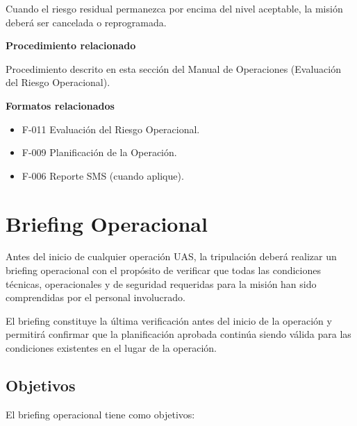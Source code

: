 Cuando el riesgo residual permanezca por encima del nivel aceptable, la misión deberá ser cancelada o reprogramada.



\begin{tcolorbox}[title=Documentos asociados,colback=gray!5,colframe=black]

\textbf{Procedimiento relacionado}

Procedimiento descrito en esta sección del Manual de Operaciones (Evaluación del Riesgo Operacional).

\vspace{0.2cm}

\textbf{Formatos relacionados}

\begin{itemize}

\item F-011 Evaluación del Riesgo Operacional.

\item F-009 Planificación de la Operación.

\item F-006 Reporte SMS (cuando aplique).

\end{itemize}

\end{tcolorbox}


\section{Briefing Operacional}

Antes del inicio de cualquier operación UAS, la tripulación deberá realizar un briefing operacional con el propósito de verificar que todas las condiciones técnicas, operacionales y de seguridad requeridas para la misión han sido comprendidas por el personal involucrado.

El briefing constituye la última verificación antes del inicio de la operación y permitirá confirmar que la planificación aprobada continúa siendo válida para las condiciones existentes en el lugar de la operación.

\subsection{Objetivos}

El briefing operacional tiene como objetivos:

